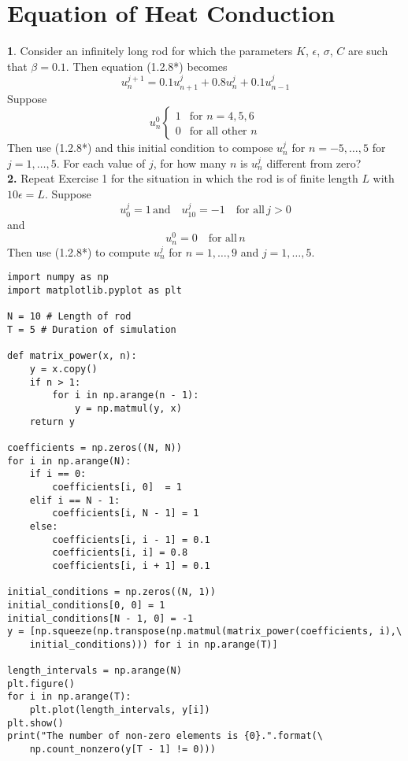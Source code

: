 \documentclass{amsbook}%
\theoremstyle{plain}
\numberwithin{equation}{section}
\begin{document}
	\section{Equation of Heat Conduction}
		
	\noindent\textbf{1}. Consider an infinitely long rod for which the parameters $K$, $\epsilon$, $\sigma$, $C$ are such that $\beta = 0.1$. Then equation (1.2.8*) becomes
	\begin{equation}
		u^{j+1}_n=0.1u^j_{n+1}+0.8u^j_n+0.1u^j_{n-1}
	\end{equation}
	Suppose
	\begin{equation}
		u^0_n
		\begin{cases}
			1 & \text{for $n=4,5,6$}\\
			0 & \text{for all other $n$}
		\end{cases}
	\end{equation}
	Then use (1.2.8*) and this initial condition to compose $u^j_n$ for $n=-5,\dots,5$ for $j=1,\dots,5$. For each value of $j$, for how many $n$ is $u^j_n$ different from zero?
	\\[12pt]

	\noindent\textbf{2.} Repeat Exercise 1 for the situation in which the rod is of finite length $L$ with $10\epsilon=L$. Suppose
	\begin{equation}
		u^j_0=1\,\text{and}\quad u^j_{10}=-1\quad\text{for all}\,j>0
	\end{equation}
	and
	\begin{equation}
		u^0_n=0\quad\text{for all}\,n
	\end{equation}
	Then use (1.2.8*) to compute $u^j_n$ for $n=1,\ldots,9$ and $j=1,\ldots,5$.
	\\[12pt]
\begin{small}
\begin{verbatim}
import numpy as np
import matplotlib.pyplot as plt

N = 10 # Length of rod
T = 5 # Duration of simulation

def matrix_power(x, n):
    y = x.copy()
    if n > 1:
        for i in np.arange(n - 1):
            y = np.matmul(y, x)
    return y

coefficients = np.zeros((N, N))
for i in np.arange(N):
    if i == 0:
        coefficients[i, 0]  = 1
    elif i == N - 1:
        coefficients[i, N - 1] = 1
    else:
        coefficients[i, i - 1] = 0.1
        coefficients[i, i] = 0.8
        coefficients[i, i + 1] = 0.1

initial_conditions = np.zeros((N, 1))
initial_conditions[0, 0] = 1
initial_conditions[N - 1, 0] = -1
y = [np.squeeze(np.transpose(np.matmul(matrix_power(coefficients, i),\
	initial_conditions))) for i in np.arange(T)]

length_intervals = np.arange(N)
plt.figure()
for i in np.arange(T):
    plt.plot(length_intervals, y[i])
plt.show()
print("The number of non-zero elements is {0}.".format(\
	np.count_nonzero(y[T - 1] != 0)))
\end{verbatim}
\end{small}
\end{document}
